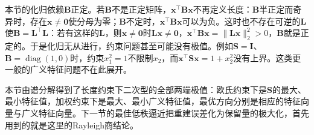 本节的化归依赖$\bm B$正定。若$\bm B$不是正定矩阵，$\bm x^\top\bm B\bm x$不再定义长度：$\bm B$半正定而奇异时，存在$\bm x\neq\bm0$使分母为零；$\bm B$不定时，$\bm x^\top\bm B\bm x$可以为负。这时也不存在可逆的$\bm L$使$\bm B=\bm L^\top\bm L$：若有这样的$\bm L$，则$\bm x\neq\bm0$时$\bm L\bm x\neq\bm0$，$\bm x^\top\bm B\bm x=\lVert\bm L\bm x\rVert_2^2>0$，$\bm B$就是正定的。于是化归无从进行，约束问题甚至可能没有极值。例如$\bm S=\bm I$、$\bm B=\operatorname{diag}(1,0)$时，约束$x_1^2=1$不限制$x_2$，而$\bm x^\top\bm S\bm x=1+x_2^2$没有上界。这类更一般的广义特征问题不在此展开。

本节由谱分解得到了长度约束下二次型的全部两端极值：欧氏约束下是$\bm S$的最大、最小特征值，加权约束下是最大、最小广义特征值，最优方向分别是相应的特征向量与广义特征向量。下一节的最佳低秩逼近把重建误差化为保留量的极大化，首先用到的就是这里的Rayleigh商结论。
